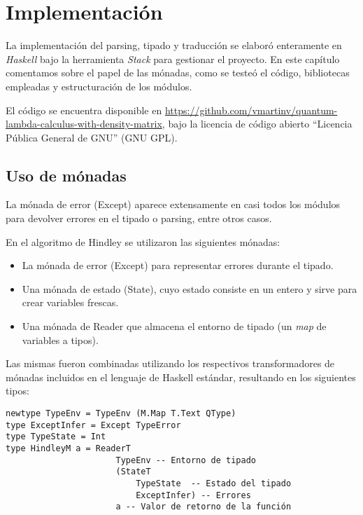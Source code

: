 
\chapter{Implementación}\label{ch:implementacion}

La implementación del parsing, tipado y traducción se elaboró enteramente en \emph{Haskell} bajo la herramienta \emph{Stack} para gestionar el proyecto. En este capítulo comentamos sobre el papel de las mónadas, como se testeó el código, bibliotecas empleadas y estructuración de los módulos.

\begin{sloppypar}
El código se encuentra disponible en \url{https://github.com/vmartinv/quantum-lambda-calculus-with-density-matrix}, bajo la licencia de código abierto ``Licencia Pública General de GNU'' (GNU GPL).
\end{sloppypar}

\section{Uso de mónadas}
La mónada de error (\textsf{Except}) aparece extensamente en casi todos los módulos para devolver errores en el tipado o parsing, entre otros casos.


En el algoritmo de Hindley se utilizaron las siguientes mónadas:
\begin{itemize}
    \item La mónada de error (\textsf{Except}) para representar errores durante el tipado.
    \item Una mónada de estado (\textsf{State}), cuyo estado consiste en un entero y sirve para crear variables frescas.
    \item Una mónada de \textsf{Reader} que almacena el entorno de tipado (un \emph{map} de variables a tipos).
\end{itemize}
Las mismas fueron combinadas utilizando los respectivos transformadores de mónadas incluidos en el lenguaje de Haskell estándar, resultando en los siguientes tipos:
\begin{verbatim}
newtype TypeEnv = TypeEnv (M.Map T.Text QType)
type ExceptInfer = Except TypeError
type TypeState = Int
type HindleyM a = ReaderT
                      TypeEnv -- Entorno de tipado
                      (StateT
                          TypeState  -- Estado del tipado
                          ExceptInfer) -- Errores
                      a -- Valor de retorno de la función
\end{verbatim}


